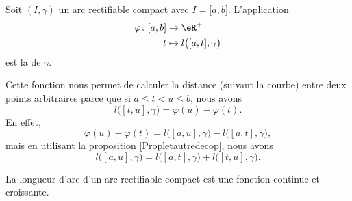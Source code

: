 \begin{definition}
    Soit $(I,\gamma)$ un arc rectifiable compact avec $I=\mathopen[ a , b \mathclose]$. L'application
    \begin{equation}
        \begin{aligned}
            \varphi\colon \mathopen[ a , b \mathclose]&\to \eR^+ \\
            t&\mapsto l\big( \mathopen[ a , t \mathclose],\gamma \big) 
        \end{aligned}
    \end{equation}
    est la  de $\gamma$.
\end{definition}
Cette fonction nous permet de calculer la distance (suivant la courbe) entre deux points arbitraires parce que si $a\leq t<u\leq b$, nous avons
\begin{equation}
    l\big( [t,u],\gamma \big)=\varphi(u)-\varphi(t).
\end{equation}
En effet,
\begin{equation}
    \varphi(u)-\varphi(t)=l\big( [a,u],\gamma \big)-l\big( [a,t],\gamma \big),
\end{equation}
mais en utilisant la proposition \ref{Propletautredecop}, nous avons
\begin{equation}
    l\big( [a,u],\gamma \big)=l\big( [a,t],\gamma \big)+l\big( [t,u],\gamma \big).
\end{equation}

\begin{proposition}
    La longueur d'arc d'un arc rectifiable compact est une fonction continue et croissante.
\end{proposition}

